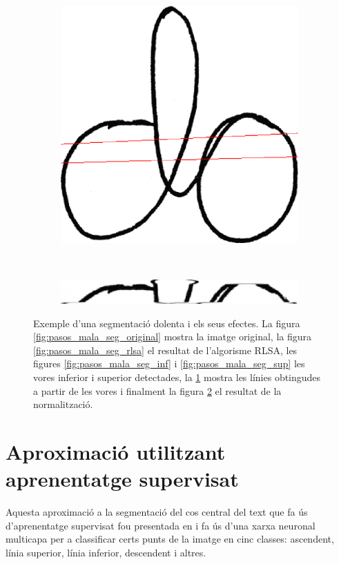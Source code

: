 \begin{figure}
\begin{subfigure}[b]{0.25\textwidth}
\centering
\includegraphics[width=\textwidth]{images/do_result.eps}
\caption{}\label{fig:pasos_mala_seg_lines}
\end{subfigure}
\\
\begin{subfigure}[b]{0.7\textwidth}
\centering
\includegraphics[width=\textwidth]{images/do_norm.eps}
\caption{}\label{fig:pasos_mala_seg_norm}
\end{subfigure}
\caption{Exemple d'una segmentació dolenta i els seus efectes. La figura \ref{fig:pasos_mala_seg_original} mostra la imatge original, la figura \ref{fig:pasos_mala_seg_rlsa} el resultat de l'algorisme RLSA, les figures \ref{fig:pasos_mala_seg_inf} i \ref{fig:pasos_mala_seg_sup} les vores inferior i superior detectades, la \ref{fig:pasos_mala_seg_lines} mostra les línies obtingudes a partir de les vores i finalment la figura \ref{fig:pasos_mala_seg_norm} el resultat de la normalització.}\label{fig:pasos_mala_segmentacio}
\end{figure}

\section{Aproximació utilitzant aprenentatge supervisat}
\label{sec:seg_nn}
Aquesta aproximació a la segmentació del cos central del text que fa ús d'aprenentatge supervisat fou presentada en \cite{DBLP:conf/pris/Gorbe-MoyaEZB08} i fa ús d'una xarxa neuronal multicapa per a classificar certs punts de la imatge en cinc classes: ascendent, línia superior, línia inferior, descendent i altres.\\

